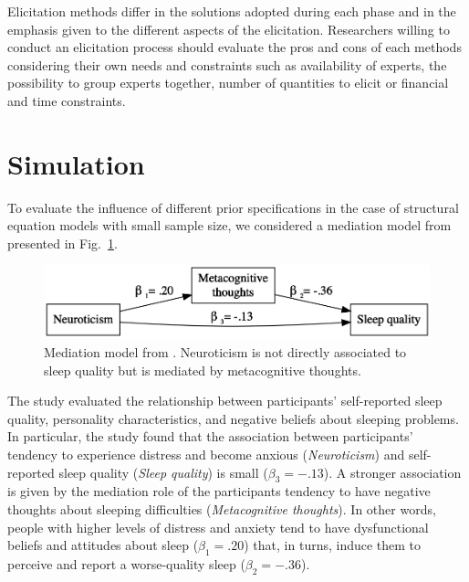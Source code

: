 \documentclass[graybox]{svmult}
\begin{document}
Elicitation methods differ in the solutions adopted during each phase and in the emphasis given to the different aspects of the elicitation.
Researchers willing to conduct an elicitation process should evaluate the pros and cons of each methods considering their own needs and constraints such as availability of experts, the possibility to group experts together, number of quantities to elicit or financial and time constraints.

\section{Simulation}
\label{sec:simulation}

To evaluate the influence of different prior specifications in the case of structural equation models with small sample size, we considered a mediation model from \cite{sellaPersonalityTraitsSleep2020}  presented in Fig.~\ref{fig:example_model}.
\begin{figure}[b]
	\sidecaption
	\includegraphics[width = .64\textwidth]{figure/Plot_example_model}
	\caption{Mediation model from \cite{sellaPersonalityTraitsSleep2020}. Neuroticism is not directly associated to sleep quality but is mediated by metacognitive thoughts.}
	\label{fig:example_model}
\end{figure}
The study evaluated the relationship between participants' self-reported sleep quality, personality characteristics, and negative beliefs about sleeping problems. In particular, the study found that the association between participants' tendency to experience distress and become anxious (\emph{Neuroticism}) and self-reported sleep quality (\emph{Sleep quality}) is small ($\beta_3=-.13$).  A stronger association is given  by the mediation role of the participants tendency to have negative thoughts about sleeping difficulties (\emph{Metacognitive thoughts}). In other words, people with higher levels of distress and anxiety tend to have dysfunctional beliefs and attitudes about sleep ($\beta_1=.20$) that, in turns, induce them to perceive and report a worse-quality sleep ($\beta_2=-.36$).
\end{document}
